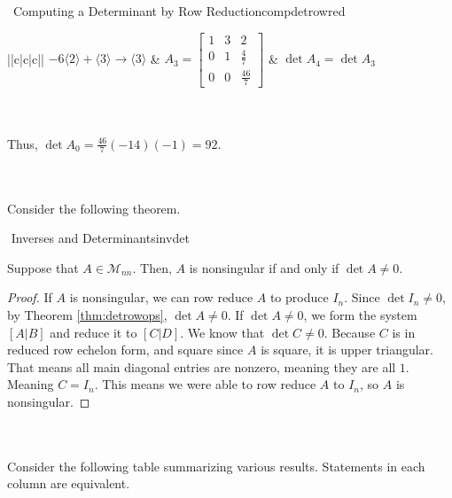 \begin{example}{\Difficulty\,\Difficulty\,\,Computing a Determinant by Row Reduction}{compdetrowred}
\begin{center}
\begin{tabular}{||c|c|c||}
                    \hline
                    \(-6\langle2\rangle+\langle3\rangle\to\langle3\rangle\) & \(A_3=\begin{bmatrix} 1 & 3 & 2 \\ 0 & 1 & \frac{4}{7} \\ 0 & 0 & \frac{46}{7} \end{bmatrix}\) & \(\det A_4=\det A_3\) \\
                    \hline
                \end{tabular}
            \end{center}
            \vphantom
            \\
            \\
            Thus, \(\det A_0=\frac{46}{7}(-14)(-1)=92\).

        \end{example}
        \vphantom
        \\
        \\
        Consider the following theorem.
        \begin{theorem}{\Stop\,\,Inverses and Determinants}{invdet}
            
            Suppose that \(A\in\mathcal{M}_{nn}\). Then, \(A\) is nonsingular if and only if \(\det A \neq 0\).
            \begin{proof}
                If \(A\) is nonsingular, we can row reduce \(A\) to produce \(I_n\). Since \(\det I_n\neq 0\), by Theorem \ref{thm:detrowops}, \(\det A\neq 0\). If \(\det A\neq 0\), we form the system \([A|B]\) and reduce it to \([C|D]\). We know that \(\det C\neq 0\). Because \(C\) is in reduced row echelon form, and square since \(A\) is square, it is upper triangular. That means all main diagonal entries are nonzero, meaning they are all \(1\). Meaning \(C=I_n\). This means we were able to row reduce \(A\) to \(I_n\), so \(A\) is nonsingular.
            \end{proof}
            
        \end{theorem}
        \vphantom
        \\
        \\
        Consider the following table summarizing various results. Statements in each column are equivalent.

